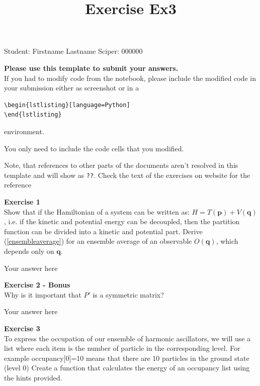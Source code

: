 \documentclass{article}
\title{Exercise Ex3}
\begin{document}
\maketitle\maketitle
\begin{center}\logo\end{center}


Student:  Firstname Lastname    Sciper: 000000

\begin{mdframed}
\textbf{Please use this template to submit your answers.}\\
If you had to modify code from the notebook, please include the modified code in your submission either as screenshot or in a

\begin{verbatim}
\begin{lstlisting}[language=Python]
\end{lstlisting}
\end{verbatim}

environment.

You only need to include the code cells that you modified.

Note, that references to other parts of the documents aren't resolved in this template and will show as \texttt{??}. Check the text of the exercises on website for the reference
\end{mdframed}

\begin{mdframed}
\textbf{Exercise 1}\\
Show that if the Hamiltonian of a system can be written as: $H = T(\mathbf{p}) + V(\mathbf{q})$,
i.e. if the kinetic and potential energy can be decoupled, then the partition function can be divided into a kinetic and potential part. Derive (\ref{ensembleaverage}) for an ensemble average of an observable $O(\mathbf{q})$, which depends only on $\mathbf{q}$.
\end{mdframed}

Your answer here

\begin{mdframed}
\textbf{Exercise 2 - Bonus}\\
Why is it important that $P'$ is a symmetric matrix?
\end{mdframed}

Your answer here

\begin{mdframed}
\textbf{Exercise 3}\\
To express the occupation of our ensemble of harmonic ascillators, we will use a list where each item is the number of particle in the corresponding level. For example occupancy[0]=10 means that there are 10 particles in the ground state (level 0)
Create a function that calculates the energy of an occupancy list using the hints provided.
\end{mdframed}
\end{document}
